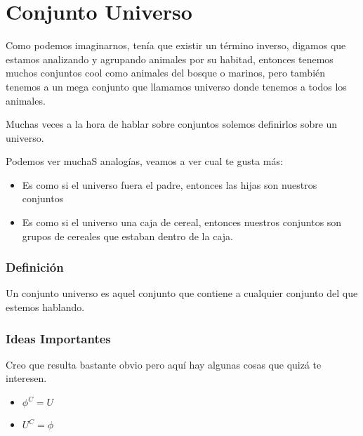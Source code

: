 \documentclass[12pt]{report}                                    %
\begin{document}
        \clearpage
        \section{Conjunto Universo}
            
            Como podemos imaginarnos, tenía que existir un término inverso, digamos que estamos
            analizando y agrupando animales por su habitad, entonces tenemos muchos conjuntos cool
            como animales del bosque o marinos, pero también tenemos a un mega conjunto que llamamos
            universo donde tenemos a todos los animales.

            Muchas veces a la hora de hablar sobre conjuntos solemos definirlos sobre un universo.

            Podemos ver muchaS analogías, veamos a ver cual te gusta más:

            \begin{itemize}
                \item Es como si el universo fuera el padre, entonces las hijas son nuestros conjuntos
                \item Es como si el universo una caja de cereal, entonces nuestros conjuntos son grupos de cereales
                    que estaban dentro de la caja.
            \end{itemize}


            \subsubsection*{Definición}
            Un conjunto universo es aquel conjunto que contiene a cualquier conjunto del que estemos hablando.


            \subsubsection*{Ideas Importantes}
            Creo que resulta bastante obvio pero aquí hay algunas cosas que quizá te interesen.
            \begin{itemize}
                \item $\phi^C = U$
                \item $U^C = \phi$
            \end{itemize}
\end{document}
